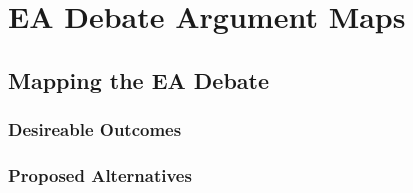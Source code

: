 \chapter{EA Debate Argument Maps}
\label{chap-arguments}


\section{Mapping the EA Debate}

\subsection{Desireable Outcomes}




\subsection{Proposed Alternatives}




